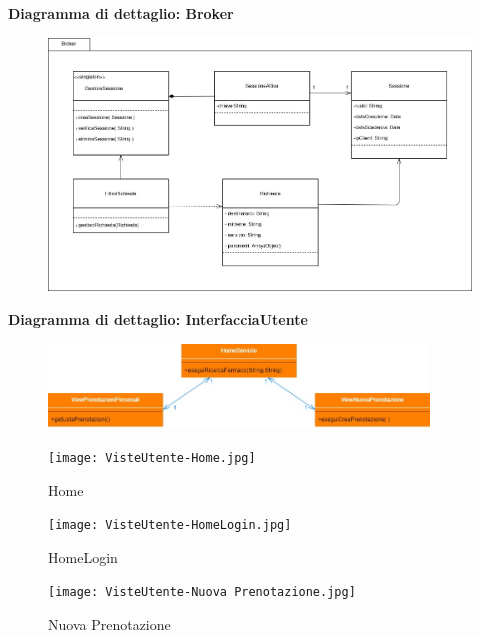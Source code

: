 \newpage

\textbf{Diagramma di dettaglio: Broker}
\begin{figure}[h!]
    \begin{center}
        \includegraphics[width=\textwidth]{immagini/Broker.jpg}
    \end{center}
\end{figure}

\newpage


\textbf{Diagramma di dettaglio: InterfacciaUtente}
\begin{figure}[h!]
    \begin{center}
        \includegraphics[width=0.9\textwidth]{immagini/ViewCliente-progettazione.jpg}
    \end{center}
\end{figure}

\begin{figure}[h!]
    \centering
    \texttt{[image: VisteUtente-Home.jpg]}
    \caption{Home}
\end{figure}
\newpage

\begin{figure}[h!]
    \centering
    \texttt{[image: VisteUtente-HomeLogin.jpg]}
    \caption{HomeLogin}
\end{figure}

\begin{figure}[h!]
    \centering
    \texttt{[image: VisteUtente-Nuova Prenotazione.jpg]}
    \caption{Nuova Prenotazione}
\end{figure}
\newpage

